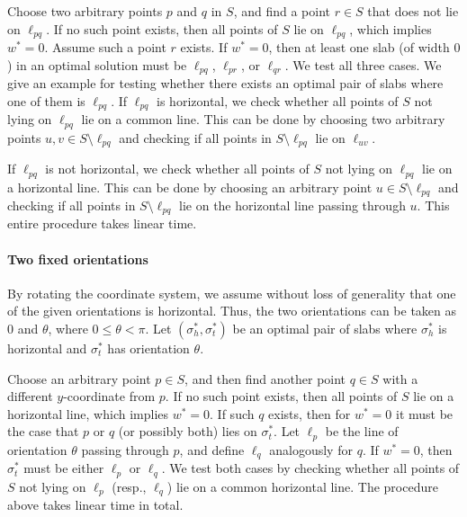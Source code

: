 Choose two arbitrary points $p$ and $q$ in $S$, and find a point $r \in S$ that does not lie on $\ell_{pq}$. 
If no such point exists, then all points of $S$ lie on $\ell_{pq}$, which implies $w^* = 0$.
Assume such a point $r$ exists. 
If $w^* = 0$, then at least one slab (of width $0$) in an optimal solution must be $\ell_{pq}$, $\ell_{pr}$, or $\ell_{qr}$.
We test all three cases. 
We give an example for testing whether there exists an optimal pair of slabs where one of them is $\ell_{pq}$.
If $\ell_{pq}$ is horizontal, we check whether all points of $S$ not lying on $\ell_{pq}$ lie on a common line.
This can be done by choosing two arbitrary points $u, v \in S\setminus \ell_{pq}$ and checking if all points in $S\setminus \ell_{pq}$ lie on $\ell_{uv}$. 

If $\ell_{pq}$ is not horizontal, we check whether all points of $S$ not lying on $\ell_{pq}$ lie on a horizontal line.
This can be done by choosing an arbitrary point $u \in S\setminus \ell_{pq}$ and checking if all points in $S\setminus \ell_{pq}$ lie on the horizontal line passing through $u$. 
This entire procedure takes linear time.

\paragraph*{Two fixed orientations}
By rotating the coordinate system, we assume without loss of generality that one of the given orientations is horizontal. Thus, the two orientations can be taken as $0$ and $\theta$, where $0\le \theta < \pi$. Let $(\sigma_h^*, \sigma_t^* )$ be an optimal pair of slabs where $\sigma_h^*$ is horizontal and $\sigma_t^*$ has orientation $\theta$.

Choose an arbitrary point $p \in S$, and then find another point $q \in S$ with a different $y$-coordinate from $p$. If no such point exists, then all points of $S$ lie on a horizontal line, which implies $w^*=0$.
If such $q$ exists, then for $w^* = 0$ it must be the case that $p$ or $q$ (or possibly both) lies on $\sigma_t^*$.
Let $\ell_p$ be the line of orientation $\theta$ passing through $p$, and define $\ell_q$ analogously for $q$.
If $w^* = 0$, then $\sigma_t^*$ must be either $\ell_p$ or $\ell_q$.
We test both cases by checking whether all points of $S$ not lying on $\ell_p$ (resp., $\ell_q$) lie on a common horizontal line. 
The procedure above takes linear time in total.

